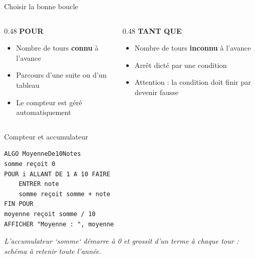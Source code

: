 \documentclass[aspectratio=169,11pt]{beamer}
\begin{document}
\begin{frame}{Choisir la bonne boucle}
\begin{columns}[t]
\begin{column}{0.48\textwidth}
{\bfseries\color{PyBleu}POUR}

\begin{itemize}
  \setlength{\itemsep}{1.5pt}\setlength{\parskip}{0pt}
  \item Nombre de tours \textbf{connu} à l'avance
  \item Parcours d'une suite ou d'un tableau
  \item Le compteur est géré automatiquement
\end{itemize}
\end{column}
\hspace{0.015\textwidth}
\begin{column}{0.48\textwidth}
{\bfseries\color{PyBleu}TANT QUE}

\begin{itemize}
  \setlength{\itemsep}{1.5pt}\setlength{\parskip}{0pt}
  \item Nombre de tours \textbf{inconnu} à l'avance
  \item Arrêt dicté par une condition
  \item Attention : la condition doit finir par devenir fausse
\end{itemize}
\end{column}
\end{columns}
\end{frame}

\begin{frame}[fragile]{Compteur et accumulateur}

\begin{lstlisting}[style=py]
ALGO MoyenneDe10Notes
somme reçoit 0
POUR i ALLANT DE 1 A 10 FAIRE
    ENTRER note
    somme reçoit somme + note
FIN POUR
moyenne reçoit somme / 10
AFFICHER "Moyenne : ", moyenne
\end{lstlisting}
\vspace{0.5pt}

{\small\color{PyGris}\itshape L'accumulateur `somme` démarre à 0 et grossit d'un terme à chaque tour : schéma à retenir toute l'année.}

\end{frame}
\end{document}
